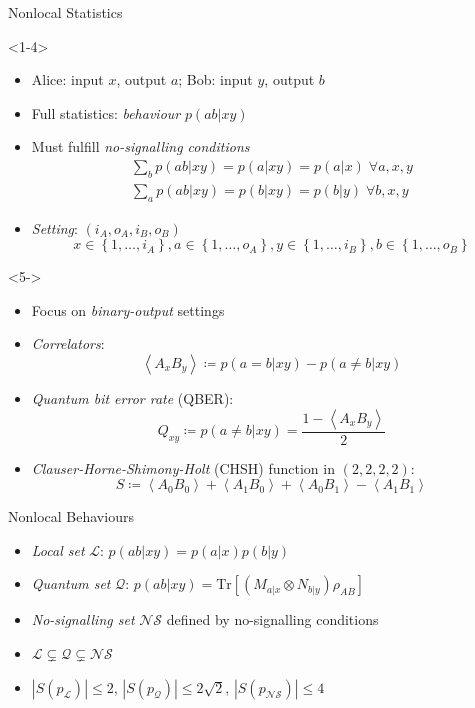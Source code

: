 \documentclass[xcolor=dvipsnames]{beamer}
\newcommand{\?}{\mathrel{?}} %
\newcommand{\abs}[1]{\left\lvert#1\right\rvert} %
\newcommand{\dintv}[2]{\left\{#1,\ldots,#2\right\}}
\newcommand{\Tr}{\mathrm{Tr}} %
\newcommand{\angleb}[1]{\left\langle #1 \right\rangle} %
\newcommand{\Ls}{\mathcal{L}}
\newcommand{\Qs}{\mathcal{Q}}
\newcommand{\NSs}{\mathcal{NS}}
\begin{document}
\begin{frame}{Nonlocal Statistics}
  \begin{onlyenv}<1-4>
  \begin{itemize}[<+->]
    \item Alice: input \(x\), output \(a\); Bob: input \(y\), output \(b\)
    \item Full statistics: \emph{behaviour} \(p(ab|xy)\)
    \item Must fulfill \emph{no-signalling conditions}
      \begin{gather*}
        \sum_b p(ab|xy) = p(a|xy) = p(a|x)\;\forall a,x,y \\
        \sum_a p(ab|xy) = p(b|xy) = p(b|y)\;\forall b,x,y
      \end{gather*}
    \item \emph{Setting}: \((i_A, o_A, i_B, o_B)\)
    \[ x \in \dintv{1}{i_A}, a \in \dintv{1}{o_A}, y \in \dintv{1}{i_B}, b \in \dintv{1}{o_B} \]
  \end{itemize}
  \end{onlyenv}
  \begin{onlyenv}<5->
  \begin{itemize}[<+->]
    \item Focus on \emph{binary-output} settings
    \item \emph{Correlators}:
      \[ \angleb{A_x B_y} \coloneqq p(a=b|xy) - p(a\neq b|xy) \]
    \item \emph{Quantum bit error rate} (QBER):
      \[ Q_{xy} \coloneqq p(a \neq b|xy) = \frac{1-\angleb{A_x B_y}}{2} \]
    \item \emph{Clauser-Horne-Shimony-Holt} (CHSH) function in \((2,2,2,2)\):
      \[ S \coloneqq \angleb{A_0 B_0} + \angleb{A_1 B_0} + \angleb{A_0 B_1} - \angleb{A_1 B_1} \]
  \end{itemize}
  \end{onlyenv}
\end{frame}

\begin{frame}{Nonlocal Behaviours}
  \begin{itemize}[<+->]
    \item \emph{Local set} \(\Ls\): \(p(ab|xy) = p(a|x)p(b|y)\)
    \item \emph{Quantum set} \(\Qs\): \(p(ab|xy) = \Tr\left[ \left(M_{a|x} \otimes N_{b|y}\right) \rho_{AB} \right]\)
    \item \emph{No-signalling set} \(\NSs\) defined by no-signalling conditions
    \item \(\Ls \subsetneq \Qs \subsetneq \NSs\)
    \item \(\abs{S(p_{\Ls})} \leq 2\), \(\abs{S(p_{\Qs})} \leq 2\sqrt{2}\), \(\abs{S(p_{\NSs})} \leq 4\)
  \end{itemize}
\end{frame}
\end{document}
